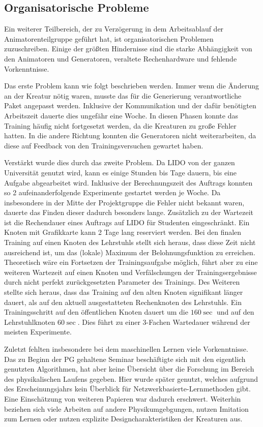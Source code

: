 \subsection{Organisatorische Probleme}
Ein weiterer Teilbereich, der zu Verzögerung in dem Arbeitsablauf der Animatorenteilgruppe geführt hat, ist organisatorischen Problemen zuzuschreiben. Einige der größten Hindernisse sind die starke Abhängigkeit von den Animatoren und Generatoren, veraltete Rechenhardware und fehlende Vorkenntnisse.

Das erste Problem kann wie folgt beschrieben werden. Immer wenn die Änderung an der Kreatur nötig waren, musste das für die Generierung verantwortliche Paket angepasst werden. Inklusive der Kommunikation und der dafür benötigten Arbeitszeit dauerte dies ungefähr eine Woche. In diesen Phasen konnte das Training häufig nicht fortgesetzt werden, da die Kreaturen zu große Fehler hatten. In die andere Richtung konnten die Generatoren nicht weiterarbeiten, da diese auf Feedback von den Trainingsversuchen gewartet haben.

Verstärkt wurde dies durch das zweite Problem. Da LIDO von der ganzen Universität genutzt wird, kann es einige Stunden bis Tage dauern, bis eine Aufgabe abgearbeitet wird. Inklusive der Berechnungszeit des Auftrags konnten so 2 aufeinanderfolgende Experimente gestartet werden je Woche. Da insbesondere in der Mitte der Projektgruppe die Fehler nicht bekannt waren, dauerte das Finden dieser dadurch besonders lange. 
Zusätzlich zu der Wartezeit ist die Rechendauer eines Auftrags auf LIDO für Studenten eingeschränkt. Ein Knoten mit Grafikkarte kann 2 Tage lang reserviert werden. Bei den finalen Training auf einen Knoten des Lehrstuhls stellt sich heraus, dass diese Zeit nicht ausreichend ist, um das (lokale) Maximum der Belohnungsfunktion zu erreichen. Theoretisch wäre ein Fortsetzen der Trainingsaufgabe möglich, führt aber zu eine weiteren Wartezeit auf einen Knoten und Verfälschungen der Trainingsergebnisse durch nicht perfekt zurückgesetzten Parameter des Trainings. 
Des Weiteren stellte sich heraus, dass das Training auf den alten Knoten signifikant länger dauert, als auf den aktuell ausgestatteten Rechenknoten des Lehrstuhls. Ein Trainingsschritt auf den öffentlichen Knoten dauert um die $160 \si{\sec}$  und auf den Lehrstuhlknoten $60 \si{\sec}$. Dies führt zu einer 3-Fachen Wartedauer während der meisten Experimente.

Zuletzt fehlten insbesondere bei dem maschinellen Lernen viele Vorkenntnisse. Das zu Beginn der PG gehaltene Seminar beschäftigte sich mit den eigentlich genutzten Algorithmen, hat aber keine Übersicht über die Forschung im Bereich des physikalischen Laufens gegeben. Hier wurde später \cite{Geijtenbeek2012} genutzt, welches aufgrund des Erscheinungsjahrs kein Überblick für Netzwerkbasierte-Lernmethoden gibt. Eine Einschätzung von weiteren Papieren war dadurch erschwert. Weiterhin beziehen sich viele Arbeiten auf andere Physikumgebgungen, nutzen Imitation zum Lernen oder nutzen explizite Designcharakteristiken der Kreaturen aus\cite{Mourot2022}.


